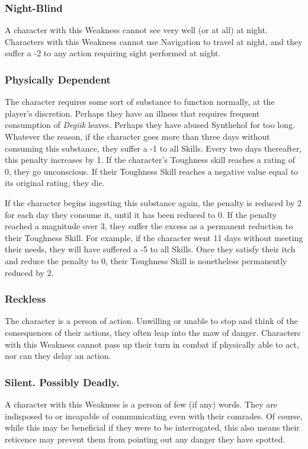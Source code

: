 \documentclass[oneside]{book}
\begin{document}
\begin{multicols}{2}
\subsubsection{Night-Blind}
A character with this Weakness cannot see very well (or at all) at night. Characters with this Weakness cannot use Navigation to travel at night, and they suffer a -2 to any action requiring sight performed at night. 
\subsubsection{Physically Dependent}
The character requires some sort of substance to function normally, at the player's discretion. Perhaps they have an illness that requires frequent consumption of \emph{Degiik} leaves. Perhaps they have abused Synthehol for too long. Whatever the reason, if the character goes more than three days without consuming this substance, they suffer a -1 to all Skills. Every two days thereafter, this penalty increases by 1. If the character's Toughness skill reaches a rating of 0, they go unconscious. If their Toughness Skill reaches a negative value equal to its original rating, they die. 

If the character begins ingesting this substance again, the penalty is reduced by 2 for each day they consume it, until it has been reduced to 0. If the penalty reached a magnitude over 3, they suffer the excess as a permanent reduction to their Toughness Skill. For example, if the character went 11 days without meeting their needs, they will have suffered a -5 to all Skills. Once they satisfy their itch and reduce the penalty to 0, their Toughness Skill is nonetheless permanently reduced by 2. 

\subsubsection{Reckless}
The character is a person of action. Unwilling or unable to stop and think of the consequences of their actions, they often leap into the maw of danger. Characters with this Weakness cannot pass up their turn in combat if physically able to act, nor can they delay an action. 

\subsubsection{Silent. Possibly Deadly.}
A character with this Weakness is a person of few (if any) words. They are indisposed to or incapable of communicating even with their comrades. Of course, while this may be beneficial if they were to be interrogated, this also means their reticence may prevent them from pointing out any danger they have spotted. 


\end{multicols}
\end{document}
